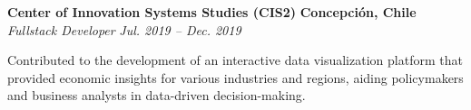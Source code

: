 \item
\headerrow
{\textbf{Center of Innovation Systems Studies (CIS2)}}
{\textbf{Concepción, Chile}}
\headerrow
{\emph{Fullstack Developer}}
{\emph{Jul. 2019 -- Dec. 2019}}
\begin{itemize*}
    \item Contributed to the development of an interactive data visualization platform that provided economic insights for various industries and regions, aiding policymakers and business analysts in data-driven decision-making.
\end{itemize*}